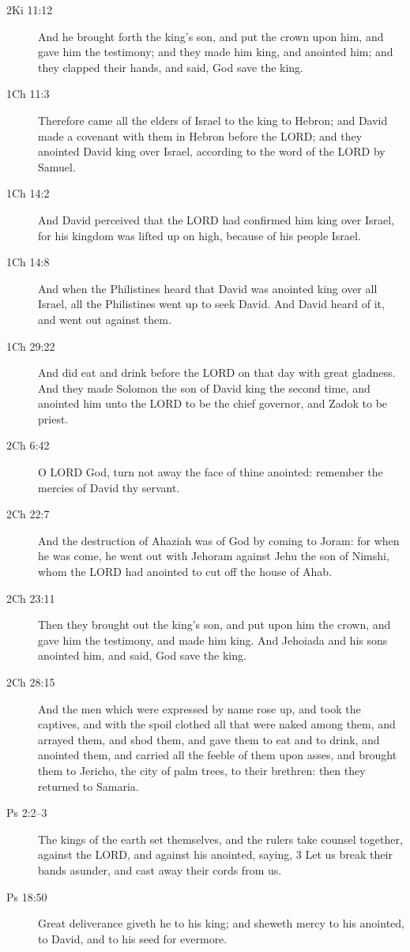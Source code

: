 \begin{description}
		\item[2Ki 11:12] And he brought forth the king's son, and put the crown upon him, and gave him the testimony; and they made him king, and anointed him; and they clapped their hands, and said, God save the king.
		\item[1Ch 11:3] Therefore came all the elders of Israel to the king to Hebron; and David made a covenant with them in Hebron before the LORD; and they anointed David king over Israel, according to the word of the LORD by Samuel.
		\item[1Ch 14:2] And David perceived that the LORD had confirmed him king over Israel, for his kingdom was lifted up on high, because of his people Israel.
		\item[1Ch 14:8] And when the Philistines heard that David was anointed king over all Israel, all the Philistines went up to seek David. And David heard of it, and went out against them.
		\item[1Ch 29:22] And did eat and drink before the LORD on that day with great gladness. And they made Solomon the son of David king the second time, and anointed him unto the LORD to be the chief governor, and Zadok to be priest.
		\item[2Ch 6:42] O LORD God, turn not away the face of thine anointed: remember the mercies of David thy servant.
		\item[2Ch 22:7] And the destruction of Ahaziah was of God by coming to Joram: for when he was come, he went out with Jehoram against Jehu the son of Nimshi, whom the LORD had anointed to cut off the house of Ahab.
		\item[2Ch 23:11] Then they brought out the king's son, and put upon him the crown, and gave him the testimony, and made him king. And Jehoiada and his sons anointed him, and said, God save the king.
		\item[2Ch 28:15] And the men which were expressed by name rose up, and took the captives, and with the spoil clothed all that were naked among them, and arrayed them, and shod them, and gave them to eat and to drink, and anointed them, and carried all the feeble of them upon asses, and brought them to Jericho, the city of palm trees, to their brethren: then they returned to Samaria.
		\item[Ps 2:2--3] The kings of the earth set themselves, and the rulers take counsel together, against the LORD, and against his anointed, saying, 3 Let us break their bands asunder, and cast away their cords from us.
		\item[Ps 18:50] Great deliverance giveth he to his king; and sheweth mercy to his anointed, to David, and to his seed for evermore.

\end{description}
